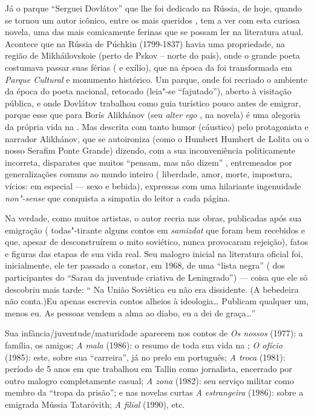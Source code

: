 Já o parque ``Serguei Dovlátov'' que lhe foi dedicado na Rússia, de
hoje, quando se tornou um autor icônico, entre os mais queridos , tem a
ver com esta curiosa novela, uma das mais comicamente ferinas que se
possam ler na literatura atual. Acontece que na Rússia de Púchkin
(1799-1837) havia uma propriedade, na região de Mikháilovskoie (perto de
Pskov -- norte do país), onde o grande poeta costumava passar suas
férias ( e exílio), que na época da  foi transformada em
\emph{Parque Cultural} e monumento histórico. Um parque, onde foi
recriado o ambiente da época do poeta nacional, retocado (leia"-se
``fajutado''), aberto à visitação pública, e onde Dovlátov trabalhou
como guia turístico pouco antes de emigrar, parque esse que para Borís
Alikhánov (seu \emph{alter ego} , na novela) é uma alegoria da própria
vida na . Mas descrita com tanto humor (cáustico) pelo protagonista
e narrador Alikhánov, que se autoironiza (como o Humbert Humbert de
Lolita ou o nosso Serafim Ponte Grande) dizendo, com a sua
inconveniência politicamente incorreta, disparates que muitos ``pensam,
mas não dizem'' , entremeados por generalizações comuns ao mundo inteiro
( liberdade, amor, morte, impostura, vícios: em especial --- sexo e
bebida), expressas com uma hilariante ingenuidade \emph{non"-sense} que
conquista a simpatia do leitor a cada página.

Na verdade, como muitos artistas, o autor recria nas obras, publicadas
após sua emigração ( todas"-tirante alguns contos em \emph{samizdat} que
foram bem recebidos e que, apesar de desconstruírem o mito soviético,
nunca provocaram rejeição), fatos e figuras das etapas de sua vida
real. Seu malogro inicial na literatura oficial foi, inicialmente, ele
ter passado a constar, em 1968, de uma ``lista negra'' ( dos
participantes do ``Sarau da juventude criativa de Leningrado'') --- coisa
que ele só descobriu mais tarde: `` Na União Soviética eu não era
dissidente. (A bebedeira não conta.)Eu apenas escrevia contos alheios à
ideologia\ldots{} Publicam qualquer um, menos eu. As pessoas vendem a alma ao
diabo, eu a dei de graça\ldots{}''

Sua infância/juventude/maturidade aparecem nos contos de \emph{Os
nossos} (1977): a família, os amigos; \emph{A mala} (1986): o resumo
de toda sua vida na ; \emph{O ofício} (1985): este, sobre sua
``carreira'', já no prelo em português; \emph{A troca} (1981): período
de 5 anos em que trabalhou em Tallin como jornalista, encerrado por
outro malogro completamente casual; \emph{A zona} (1982): seu serviço
militar como membro da ``tropa da prisão''; e nas novelas curtas
\emph{A estrangeira} (1986): sobre a emigrada Mússia Tataróvith; \emph{A filial} (1990), etc.

